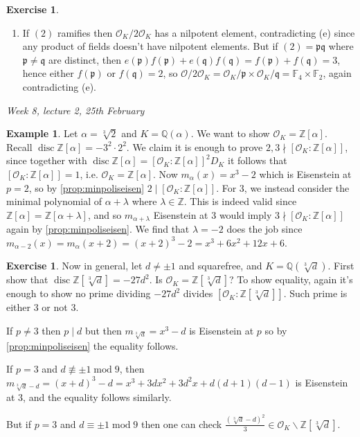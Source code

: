 \documentclass{article}
\newcommand{\Z}{\mathbb{Z}}
\newcommand{\Q}{\mathbb{Q}}
\newcommand{\F}{\mathbb{F}}
\newcommand{\Mod}{\operatorname{mod}}
\newcommand{\disc}{\operatorname{disc}}
\newcommand{\ri}{\mathcal{O}}
\newcommand{\ip}{\mathfrak{p}}
\newcommand{\iq}{\mathfrak{q}}
\theoremstyle{definition}
\newtheorem{example}[defn]{Example}
\newtheorem{exe}[defn]{Exercise}
\begin{document}
\begin{exe}
\begin{enumerate}
\begin{enumerate}
\item If $(2)$ ramifies then $\ri_K/2\ri_K$ has a nilpotent element, contradicting (e) since any product of fields doesn't have nilpotent elements. But if $(2)=\ip\iq$ where $\ip\neq\iq$ are distinct, then $e(\ip)f(\ip)+e(\iq)f(\iq)=f(\ip)+f(\iq)=3$, hence either $f(\ip)$ or $f(\iq)=2$, so $\ri/2\ri_K=\ri_K/\ip\times\ri_K/\iq=\F_4\times\F_2$, again contradicting (e).
\end{enumerate}
\end{enumerate}
\end{exe}

\begin{flushright}
\textit{Week 8, lecture 2, 25th February}
\end{flushright}

\begin{example}
Let $\alpha=\sqrt[3]2$ and $K=\Q(\alpha)$. We want to show $\ri_K=\Z[\alpha]$. Recall $\disc \Z[\alpha]=-3^2\cdot 2^2$. We claim it is enough to prove $2,3\nmid [\ri_K:\Z[\alpha]]$, since together with $\disc\Z[\alpha]=[\ri_K:\Z[\alpha]]^2 D_K$ it follows that $[\ri_K:\Z[\alpha]]=1$, i.e. $\ri_K=\Z[\alpha]$.  Now $m_\alpha(x)=x^3-2$ which is Eisenstein at $p=2$, so by \ref{prop:minpoliseisen} $2\mid [\ri_K:\Z[\alpha]]$. For 3, we instead consider the minimal polynomial of $\alpha+\lambda$ where $\lambda\in\Z$. This is indeed valid since $\Z[\alpha]=\Z[\alpha+\lambda]$, and so $m_{\alpha+\lambda}$ Eisenstein at 3 would imply $3\nmid [\ri_K:\Z[\alpha]]$ again by \ref{prop:minpoliseisen}. We find that $\lambda=-2$ does the job since $m_{\alpha-2}(x)=m_\alpha(x+2)=(x+2)^3-2=x^3+6x^2+12x+6$.
\end{example}

\begin{exe}
Now in general, let $d\neq\pm 1$ and squarefree, and $K=\Q\left(\sqrt[3]d\right)$. First show that $\disc \Z\left[\sqrt[3]d\right]=-27d^2$. Is $\ri_K=\Z\left[\sqrt[3]d\right]$? To show equality, again it's enough to show no prime dividing $-27d^2$ divides $\left[\ri_K:\Z\left[\sqrt[3]d\right]\right]$. Such prime is either 3 or not 3.

If $p\neq 3$ then $p\mid d$ but then $m_{\sqrt[3]d}=x^3-d$ is Eisenstein at $p$ so by \ref{prop:minpoliseisen} the equality follows.

If $p=3$ and $d\not\equiv\pm 1\Mod 9$, then $m_{\sqrt[3]d-d}=(x+d)^3-d=x^3+3dx^2+3d^2x+d(d+1)(d-1)$ is Eisenstein at 3, and the equality follows similarly.

But if $p=3$ and $d\equiv\pm 1\Mod 9$ then one can check $\frac{\left(\sqrt[3]d-d\right)^2}{3}\in\ri_K\backslash\Z\left[\sqrt[3]d\right]$.
\end{exe}
\end{document}
